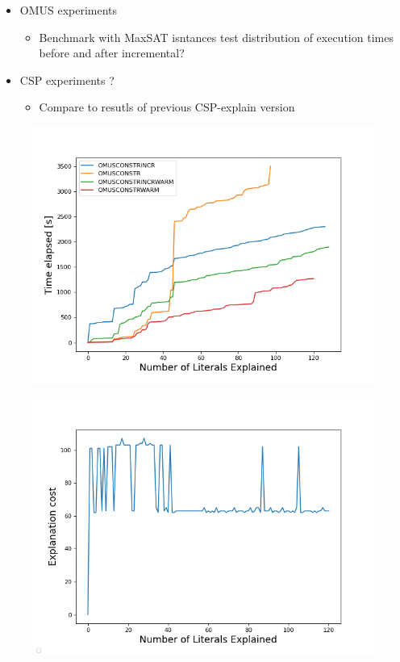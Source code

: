 

\begin{itemize}
    \item OMUS experiments
    \begin{itemize}
        \item Benchmark with MaxSAT isntances test distribution of execution times before and after incremental? 
    \end{itemize}
    \item CSP experiments ? 
    \begin{itemize}
        \item Compare to resutls of previous CSP-explain version
    \end{itemize}
\end{itemize}

\begin{figure}[]
    \centering
    \includegraphics[width=\textwidth]{figures/omusConstrCumulative.png}
    \caption{}
    \label{}
\end{figure}

\begin{figure}[]
    \centering
    \includegraphics[width=\textwidth]{figures/explanation_cost.png}
    \caption{}
    \label{}
\end{figure}

